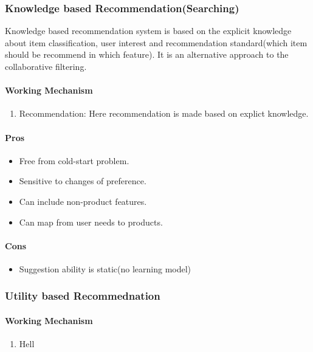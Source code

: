 \subsubsection{Knowledge based Recommendation(Searching)}
Knowledge based recommendation system \cite{recommend} is based on the explicit knowledge about item classification, user interest and recommendation standard(which item should be recommend in which feature). It is an alternative approach to the collaborative filtering.
\paragraph{Working Mechanism}\hfill

\begin{enumerate}
	\item Recommendation: Here recommendation is made based on explict knowledge.
\end{enumerate}
\paragraph{Pros}\hfill

\begin{itemize}
	\item Free from cold-start problem.
	\item Sensitive to changes of preference.
	\item Can include non-product features.
	\item Can map from user needs to products.
\end{itemize}
\paragraph{Cons}\hfill

\begin{itemize}
	\item Suggestion ability is static(no learning model)
\end{itemize}

\subsubsection{Utility based Recommednation}
\paragraph{Working Mechanism}\hfill
\begin{enumerate}
	\item Hell
\end{enumerate}
